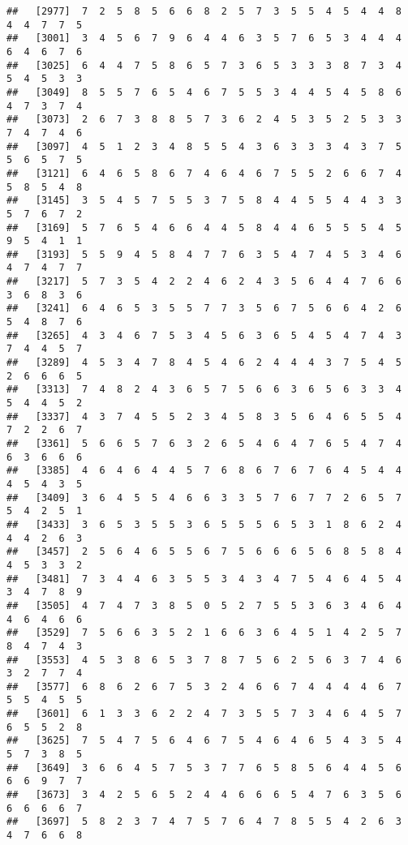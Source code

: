 \documentclass[
]{book}
\begin{document}
\begin{verbatim}
##   [2977]  7  2  5  8  5  6  6  8  2  5  7  3  5  5  4  5  4  4  8  4  4  7  7  5
##   [3001]  3  4  5  6  7  9  6  4  4  6  3  5  7  6  5  3  4  4  4  6  4  6  7  6
##   [3025]  6  4  4  7  5  8  6  5  7  3  6  5  3  3  3  8  7  3  4  5  4  5  3  3
##   [3049]  8  5  5  7  6  5  4  6  7  5  5  3  4  4  5  4  5  8  6  4  7  3  7  4
##   [3073]  2  6  7  3  8  8  5  7  3  6  2  4  5  3  5  2  5  3  3  7  4  7  4  6
##   [3097]  4  5  1  2  3  4  8  5  5  4  3  6  3  3  3  4  3  7  5  5  6  5  7  5
##   [3121]  6  4  6  5  8  6  7  4  6  4  6  7  5  5  2  6  6  7  4  5  8  5  4  8
##   [3145]  3  5  4  5  7  5  5  3  7  5  8  4  4  5  5  4  4  3  3  5  7  6  7  2
##   [3169]  5  7  6  5  4  6  6  4  4  5  8  4  4  6  5  5  5  4  5  9  5  4  1  1
##   [3193]  5  5  9  4  5  8  4  7  7  6  3  5  4  7  4  5  3  4  6  4  7  4  7  7
##   [3217]  5  7  3  5  4  2  2  4  6  2  4  3  5  6  4  4  7  6  6  3  6  8  3  6
##   [3241]  6  4  6  5  3  5  5  7  7  3  5  6  7  5  6  6  4  2  6  5  4  8  7  6
##   [3265]  4  3  4  6  7  5  3  4  5  6  3  6  5  4  5  4  7  4  3  7  4  4  5  7
##   [3289]  4  5  3  4  7  8  4  5  4  6  2  4  4  4  3  7  5  4  5  2  6  6  6  5
##   [3313]  7  4  8  2  4  3  6  5  7  5  6  6  3  6  5  6  3  3  4  5  4  4  5  2
##   [3337]  4  3  7  4  5  5  2  3  4  5  8  3  5  6  4  6  5  5  4  7  2  2  6  7
##   [3361]  5  6  6  5  7  6  3  2  6  5  4  6  4  7  6  5  4  7  4  6  3  6  6  6
##   [3385]  4  6  4  6  4  4  5  7  6  8  6  7  6  7  6  4  5  4  4  4  5  4  3  5
##   [3409]  3  6  4  5  5  4  6  6  3  3  5  7  6  7  7  2  6  5  7  5  4  2  5  1
##   [3433]  3  6  5  3  5  5  3  6  5  5  5  6  5  3  1  8  6  2  4  4  4  2  6  3
##   [3457]  2  5  6  4  6  5  5  6  7  5  6  6  6  5  6  8  5  8  4  4  5  3  3  2
##   [3481]  7  3  4  4  6  3  5  5  3  4  3  4  7  5  4  6  4  5  4  3  4  7  8  9
##   [3505]  4  7  4  7  3  8  5  0  5  2  7  5  5  3  6  3  4  6  4  4  6  4  6  6
##   [3529]  7  5  6  6  3  5  2  1  6  6  3  6  4  5  1  4  2  5  7  8  4  7  4  3
##   [3553]  4  5  3  8  6  5  3  7  8  7  5  6  2  5  6  3  7  4  6  3  2  7  7  4
##   [3577]  6  8  6  2  6  7  5  3  2  4  6  6  7  4  4  4  4  6  7  5  5  4  5  5
##   [3601]  6  1  3  3  6  2  2  4  7  3  5  5  7  3  4  6  4  5  7  6  5  5  2  8
##   [3625]  7  5  4  7  5  6  4  6  7  5  4  6  4  6  5  4  3  5  4  5  7  3  8  5
##   [3649]  3  6  6  4  5  7  5  3  7  7  6  5  8  5  6  4  4  5  6  6  6  9  7  7
##   [3673]  3  4  2  5  6  5  2  4  4  6  6  6  5  4  7  6  3  5  6  6  6  6  6  7
##   [3697]  5  8  2  3  7  4  7  5  7  6  4  7  8  5  5  4  2  6  3  4  7  6  6  8

\end{verbatim}
\end{document}
